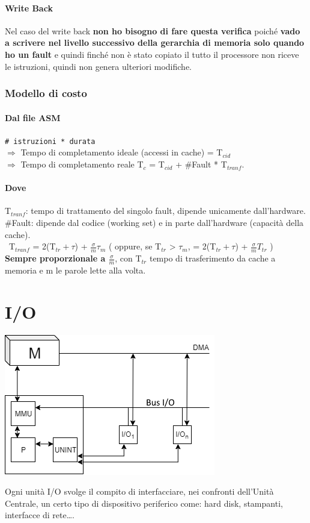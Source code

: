 \documentclass[10pt]{report}
\begin{document}
\paragraph{Write Back} Nel caso del write back \textbf{non ho bisogno di fare questa verifica} poiché \textbf{vado a scrivere nel livello successivo della gerarchia di memoria solo quando ho un fault} e quindi finché non è stato copiato il tutto il processore non riceve le istruzioni, quindi non genera ulteriori modifiche.
\subsubsection{Modello di costo}
\paragraph{Dal file ASM} \texttt{\# istruzioni * durata}\\
$\Rightarrow$ Tempo di completamento ideale (accessi in cache) = T$_{cid}$\\
$\Rightarrow$ Tempo di completamento reale T$_c$ = T$_{cid}$ + \#Fault * T$_{tranf}$.
\paragraph{Dove} T$_{tranf}$: tempo di trattamento del singolo fault, dipende unicamente dall'hardware.\\
\#Fault: dipende dal codice (working set) e in parte dall'hardware (capacità della cache).\\\
T$_{tranf}$ = 2(T$_{tr} + \tau$) + $\frac{\sigma}{m}\tau_m$ ( oppure, se T$_{tr}$ > $\tau_m$, = 2(T$_{tr} + \tau$) + $\frac{\sigma}{m}T_{tr}$ )\\
\textbf{Sempre proporzionale a $\frac{\sigma}{m}$}, con T$_{tr}$ tempo di trasferimento da cache a memoria e m le parole lette alla volta.
\section{I/O}
\begin{center}
	\includegraphics[scale=1]{procuf.png}
\end{center}
Ogni unità I/O svolge il compito di interfacciare, nei confronti dell'Unità Centrale, un certo tipo di dispositivo periferico come: hard disk, stampanti, interfacce di rete\ldots.\\
\end{document}
